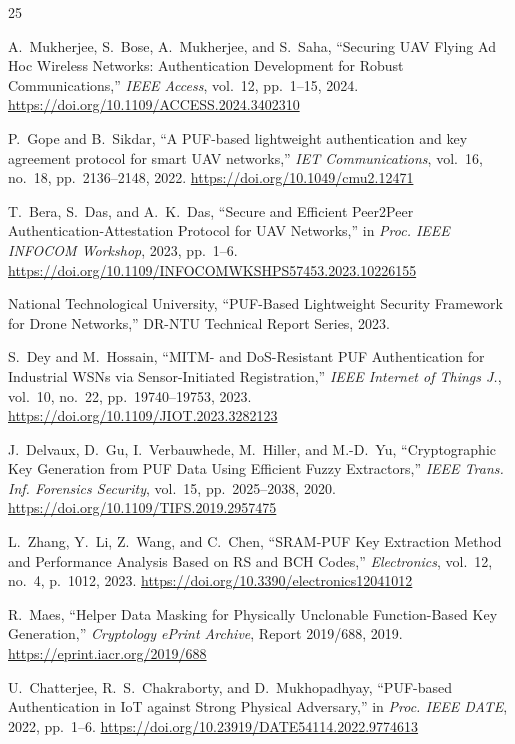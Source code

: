 \documentclass[11pt,a4paper]{article}
\begin{document}
\begin{thebibliography}{25}

A.~Mukherjee, S.~Bose, A.~Mukherjee, and S.~Saha, ``Securing UAV Flying Ad Hoc Wireless Networks: Authentication Development for Robust Communications,'' \textit{IEEE Access}, vol.~12, pp.~1--15, 2024. \url{https://doi.org/10.1109/ACCESS.2024.3402310}

P.~Gope and B.~Sikdar, ``A PUF-based lightweight authentication and key agreement protocol for smart UAV networks,'' \textit{IET Communications}, vol.~16, no.~18, pp.~2136--2148, 2022. \url{https://doi.org/10.1049/cmu2.12471}

T.~Bera, S.~Das, and A.~K.~Das, ``Secure and Efficient Peer2Peer Authentication-Attestation Protocol for UAV Networks,'' in \textit{Proc. IEEE INFOCOM Workshop}, 2023, pp.~1--6. \url{https://doi.org/10.1109/INFOCOMWKSHPS57453.2023.10226155}

National Technological University, ``PUF-Based Lightweight Security Framework for Drone Networks,'' DR-NTU Technical Report Series, 2023.

S.~Dey and M.~Hossain, ``MITM- and DoS-Resistant PUF Authentication for Industrial WSNs via Sensor-Initiated Registration,'' \textit{IEEE Internet of Things J.}, vol.~10, no.~22, pp.~19740--19753, 2023. \url{https://doi.org/10.1109/JIOT.2023.3282123}

J.~Delvaux, D.~Gu, I.~Verbauwhede, M.~Hiller, and M.-D.~Yu, ``Cryptographic Key Generation from PUF Data Using Efficient Fuzzy Extractors,'' \textit{IEEE Trans. Inf. Forensics Security}, vol.~15, pp.~2025--2038, 2020. \url{https://doi.org/10.1109/TIFS.2019.2957475}

L.~Zhang, Y.~Li, Z.~Wang, and C.~Chen, ``SRAM-PUF Key Extraction Method and Performance Analysis Based on RS and BCH Codes,'' \textit{Electronics}, vol.~12, no.~4, p.~1012, 2023. \url{https://doi.org/10.3390/electronics12041012}

R.~Maes, ``Helper Data Masking for Physically Unclonable Function-Based Key Generation,'' \textit{Cryptology ePrint Archive}, Report 2019/688, 2019. \url{https://eprint.iacr.org/2019/688}

U.~Chatterjee, R.~S.~Chakraborty, and D.~Mukhopadhyay, ``PUF-based Authentication in IoT against Strong Physical Adversary,'' in \textit{Proc. IEEE DATE}, 2022, pp.~1--6. \url{https://doi.org/10.23919/DATE54114.2022.9774613}


\end{thebibliography}
\end{document}
